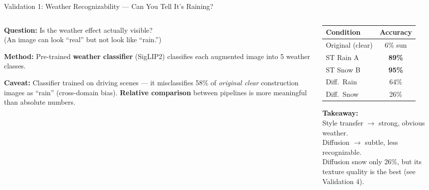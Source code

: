 \documentclass[aspectratio=169, 11pt]{beamer}
\begin{document}
\begin{frame}{Validation 1: Weather Recognizability --- Can You Tell It's Raining?}

\begin{columns}[T]
\begin{column}{0.52\textwidth}
\textbf{Question:} Is the weather effect actually visible?\\
{\small (An image can look ``real'' but not look like ``rain.'')}

\vspace{0.2em}
\textbf{Method:} Pre-trained \textbf{weather classifier} (SigLIP2) classifies each augmented image into 5 weather classes.

\vspace{0.2em}
\textbf{Caveat:} Classifier trained on driving scenes --- it misclassifies 58\% of \textit{original clear} construction images as ``rain'' (cross-domain bias). \textbf{Relative comparison} between pipelines is more meaningful than absolute numbers.
\end{column}
\begin{column}{0.46\textwidth}
\centering
\footnotesize
\begin{tabular}{lc}
\toprule
\textbf{Condition} & \textbf{Accuracy} \\
\midrule
Original (clear) & 6\% sun \\
\midrule
ST Rain A & \textbf{89\%} \\
ST Snow B & \textbf{95\%} \\
\midrule
Diff.\ Rain & 64\% \\
Diff.\ Snow & {\color{warnred}26\%} \\
\bottomrule
\end{tabular}

\vspace{0.5em}
\textbf{Takeaway:}\\
Style transfer $\to$ strong, obvious weather.\\
Diffusion $\to$ subtle, less recognizable.\\[0.3em]
{\color{warnred}Diffusion snow only 26\%}, but its texture quality is the best (see Validation 4).
\end{column}
\end{columns}
\end{frame}
\end{document}
